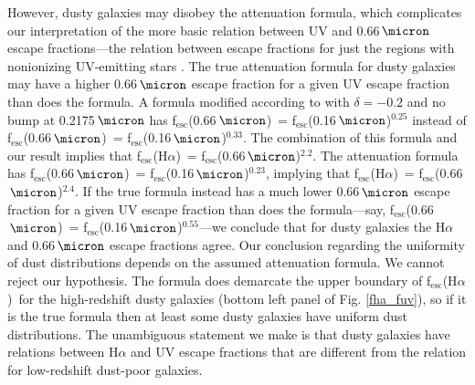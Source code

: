 \documentclass[preprint]{aastex}
\newcommand{\alephuv}{f$_{\mathrm{esc}}$(0.16$\,\micron$)}
\newcommand{\alephha}{f$_{\mathrm{esc}}$(H$\alpha$)}
\newcommand{\alephuvha}{f$_{\mathrm{esc}}$(0.66$\,\micron$)}
\begin{document}
However, dusty galaxies may disobey the \citet{calzetti00} attenuation
formula, which complicates our interpretation of the more basic relation
between UV and 0.66$\,\micron$ escape fractions---the relation between
escape fractions for just the regions with nonionizing UV-emitting stars
\citep{reddy10,reddy12,reddy15,buat11,buat12,penner12,kriek13}.  The true attenuation
formula for dusty galaxies may have a higher 0.66$\,\micron$ escape fraction
for a given UV escape fraction than does the \citet{calzetti00} formula.  A
formula modified according to
\citet{kriek13} with $\delta = -0.2$ and no bump at 0.2175$\,\micron$ has
\alephuvha~=
\alephuv$^{0.25}$ instead of \alephuvha~= \alephuv$^{0.33}$.  The combination of
this \citet{kriek13} formula and our result implies that
\alephha~= \alephuvha$^{2.2}$.  The \citet{reddy15} attenuation formula has
\alephuvha~= \alephuv$^{0.23}$, implying that \alephha~= \alephuvha$^{2.4}$.
If the true formula instead has a
much lower 0.66$\,\micron$ escape fraction for a given UV escape
fraction than does the \citet{calzetti00} formula---say, \alephuvha~=
\alephuv$^{0.55}$---we conclude that for dusty
galaxies the H$\alpha$ and 0.66$\,\micron$ escape fractions agree.  Our
conclusion regarding the uniformity of dust distributions depends on the
assumed attenuation formula.  We cannot reject our hypothesis.  The
\citet{calzetti00} formula does demarcate the upper boundary of \alephha~for the
high-redshift dusty galaxies (bottom left panel of Fig. \ref{fha_fuv}), so
if it is the true formula then at least some dusty galaxies have uniform
dust distributions.  The unambiguous statement we make is that dusty galaxies
have relations between H$\alpha$ and UV escape fractions that are different from
the relation for low-redshift dust-poor galaxies.
\end{document}

